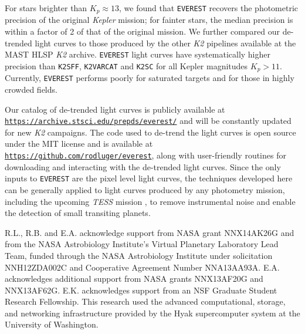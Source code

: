\documentclass[]{emulateapj}
\newcommand{\note}[1]{{\color{red} #1}}
\begin{document}
For stars brighter than $K_p \approx 13$, we found that \texttt{EVEREST} recovers the 
photometric precision of the original \emph{Kepler} mission; for fainter stars, the 
median precision is within a factor of 2 of that of the original mission.
We further compared our de-trended light curves to those produced by the other \emph{K2} pipelines
available at the MAST HLSP \emph{K2} archive.
\texttt{EVEREST} light curves have systematically higher precision than \texttt{K2SFF},
\texttt{K2VARCAT} and \texttt{K2SC} for all Kepler magnitudes $K_p > 11$. Currently, \texttt{EVEREST}
performs poorly for saturated targets and for those in highly crowded fields.

%
%
%
Our catalog of de-trended light curves is publicly available at 
\texttt{\url{https://archive.stsci.edu/prepds/everest/}} and will be constantly
updated for new \emph{K2} campaigns. The code used to de-trend the light curves
is open source under the MIT license and is available at \texttt{\url{https://github.com/rodluger/everest}},
along with user-friendly routines for downloading and interacting with the de-trended light curves.
Since the only
inputs to \texttt{EVEREST} are the pixel level light curves, the techniques developed
here can be generally applied to light curves produced by any photometry mission,
including the upcoming \emph{TESS} mission \citep{RIC15}, to remove instrumental noise
and enable the detection of small transiting planets.

\begin{acknowledgments}
R.L., R.B. and E.A. acknowledge support from NASA grant NNX14AK26G
and from the NASA Astrobiology
Institute's Virtual Planetary Laboratory Lead Team, funded
through the NASA Astrobiology Institute under solicitation
NNH12ZDA002C and Cooperative Agreement Number
NNA13AA93A. E.A. acknowledges additional support from NASA grants 
NNX13AF20G and NNX13AF62G. E.K. acknowledges support from an NSF 
Graduate Student Research Fellowship.
This research used the advanced computational,
storage, and networking infrastructure provided by the
Hyak supercomputer system at the University of Washington.
\end{acknowledgments}

\pagebreak



\end{document}
